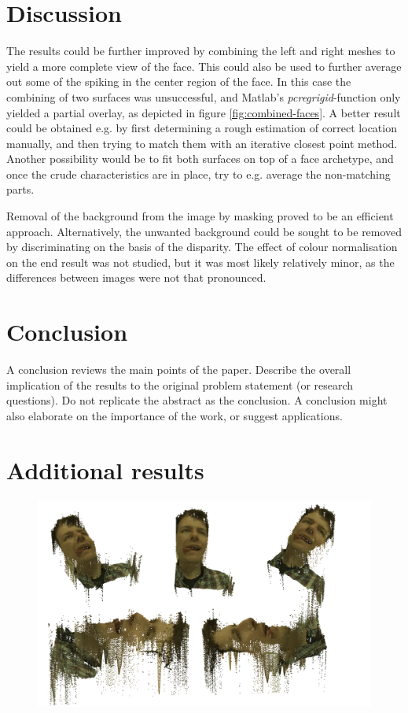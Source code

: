 \documentclass[journal]{IEEEtran}
\newcommand{\gray}[1]{\color{gray}#1\color{black}}
\begin{document}
\section{Discussion}

The results could be further improved by combining the left and right meshes to yield a more complete view of the face. 
This could also be used to further average out some of the spiking in the center region of the face.
In this case the combining of two surfaces was unsuccessful, and Matlab's \textit{pcregrigid}-function only yielded a partial overlay, as depicted in figure \ref{fig:combined-faces}.
A better result could be obtained e.g. by first determining a rough estimation of correct location manually, and then trying to match them with an iterative closest point method.
Another possibility would be to fit both surfaces on top of a face archetype, and once the crude characteristics are in place, try to e.g. average the non-matching parts.

Removal of the background from the image by masking proved to be an efficient approach. 
Alternatively, the unwanted background could be sought to be removed by discriminating on the basis of the disparity. 
The effect of colour normalisation on the end result was not studied, but it was most likely relatively minor, as the differences between images were not that pronounced.


\section{Conclusion}
\gray{A conclusion reviews the main points of the paper. Describe the overall implication of the results to the original problem statement (or research questions). Do not replicate the abstract as the conclusion. A conclusion might also elaborate on the importance of the work, or suggest applications.}
\appendices
\section{Additional results}
\FloatBarrier


\begin{figure}
    \centering
    \includegraphics[width=\linewidth]{result_S1_356}
	\label{fig:result_S1_356}
\end{figure}
\end{document}
